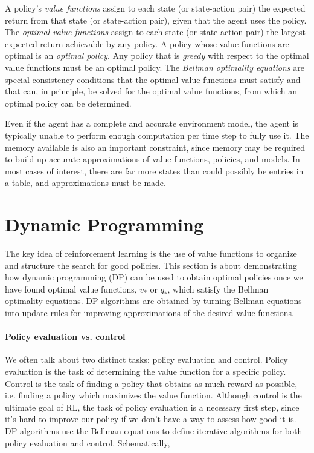 \documentclass[12pt]{article}
\begin{document}
A policy's \emph{value functions} assign to each state (or state-action pair) the expected return from that state (or state-action pair), given that the agent uses the policy. The \emph{optimal value functions} assign to each state (or state-action pair) the largest expected return achievable by any policy. A policy whose value functions are optimal is an \emph{optimal policy}. Any policy that is \emph{greedy} with respect to the optimal value functions must be an optimal policy. The \emph{Bellman optimality equations} are special consistency conditions that the optimal value functions must satisfy and that can, in principle, be solved for the optimal value functions, from which an optimal policy can be determined.

Even if the agent has a complete and accurate environment model, the agent is typically unable to perform enough computation per time step to fully use it. The memory available is also an important constraint, since memory may be required to build up accurate approximations of value functions, policies, and models. In most cases of interest, there are far more states than could possibly be entries in a table, and approximations must be made.

\section{Dynamic Programming}
The key idea of reinforcement learning is the use of value functions to organize and structure the search for good policies. This section is about demonstrating how dynamic programming (DP) can be used to obtain optimal policies once we have found optimal value functions, $v_*$ or $q_*$, which satisfy the Bellman optimality equations. DP algorithms are obtained by turning Bellman equations into update rules for improving approximations of the desired value functions.

\paragraph{Policy evaluation vs. control}
We often talk about two distinct tasks: policy evaluation and control. Policy evaluation is the task of determining the value function for a specific policy. Control is the task of finding a policy that obtains as much reward as possible, i.e. finding a policy which maximizes the value function. Although control is the ultimate goal of RL, the task of policy evaluation is a necessary first step, since it's hard to improve our policy if we don't have a way to assess how good it is. DP algorithms use the Bellman equations to define iterative algorithms for both policy evaluation and control. Schematically,
\end{document}
